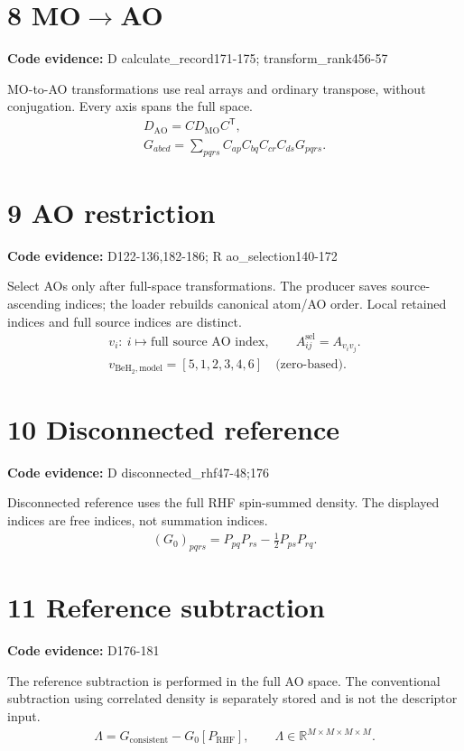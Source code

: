 \documentclass[10pt,a4paper]{article}
\newcommand{\stage}[2]{\section*{#1}\textbf{Code evidence:} #2\par}
\begin{document}
\par\noindent\begin{minipage}{\linewidth}
\stage{8 MO$\to$AO}{D calculate\_record171-175; transform\_rank456-57}
MO-to-AO transformations use real arrays and ordinary transpose, without conjugation. Every axis spans the full space.
\[
\begin{gathered}
D_{\mathrm{AO}}=CD_{\mathrm{MO}}C^{\mathsf T},\\ G_{abcd}=\sum_{pqrs}C_{ap}C_{bq}C_{cr}C_{ds}G_{pqrs}.
\end{gathered}
\]
\end{minipage}\par\vspace{4pt}
\par\noindent\begin{minipage}{\linewidth}
\stage{9 AO restriction}{D122-136,182-186; R ao\_selection140-172}
Select AOs only after full-space transformations. The producer saves source-ascending indices; the loader rebuilds canonical atom/AO order. Local retained indices and full source indices are distinct.
\[
\begin{gathered}
v_i:\ i\mapsto\text{full source AO index},\qquad A^{\mathrm{sel}}_{ij}=A_{v_i v_j}.\\ v_{\mathrm{BeH_2,model}}=[5,1,2,3,4,6]\quad\text{(zero-based)}.
\end{gathered}
\]
\end{minipage}\par\vspace{4pt}
\par\noindent\begin{minipage}{\linewidth}
\stage{10 Disconnected reference}{D disconnected\_rhf47-48;176}
Disconnected reference uses the full RHF spin-summed density. The displayed indices are free indices, not summation indices.
\[
\begin{gathered}
(G_0)_{pqrs}=P_{pq}P_{rs}-\tfrac12P_{ps}P_{rq}.
\end{gathered}
\]
\end{minipage}\par\vspace{4pt}
\par\noindent\begin{minipage}{\linewidth}
\stage{11 Reference subtraction}{D176-181}
The reference subtraction is performed in the full AO space. The conventional subtraction using correlated density is separately stored and is not the descriptor input.
\[
\begin{gathered}
\Lambda=G_{\mathrm{consistent}}-G_0[P_{\mathrm{RHF}}],\qquad \Lambda\in\mathbb R^{M\times M\times M\times M}.
\end{gathered}
\]
\end{minipage}\par\vspace{4pt}
\end{document}
